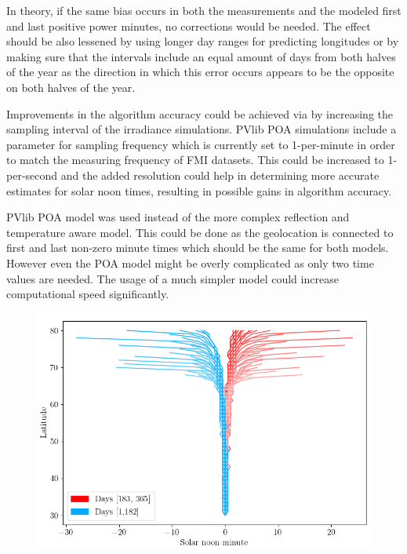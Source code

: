 In theory, if the same bias occurs in both the measurements and the modeled first and last positive power minutes, no corrections would be needed. The effect should be also lessened by using longer day ranges for predicting longitudes or by making sure that the intervals include an equal amount of days from both halves of the year as the direction in which this error occurs appears to be the opposite on both halves of the year.

Improvements in the algorithm accuracy could be achieved via by increasing the sampling interval of the irradiance simulations. PVlib POA simulations include a parameter for sampling frequency which is currently set to 1-per-minute in order to match the measuring frequency of FMI datasets. This could be increased to 1-per-second and the added resolution could help in determining more accurate estimates for solar noon times, resulting in possible gains in algorithm accuracy.

PVlib POA model was used instead of the more complex reflection and temperature aware model. This could be done as the geolocation is connected to first and last non-zero minute times which should be the same for both models. However even the POA model might be overly complicated as only two time values are needed. The usage of a much simpler model could increase computational speed significantly.




\begin{figure}[]
\centering
\includegraphics[width=1\linewidth]{pics/solarnoontimes2}
\label{fig_solarnoontimes}
\end{figure}







